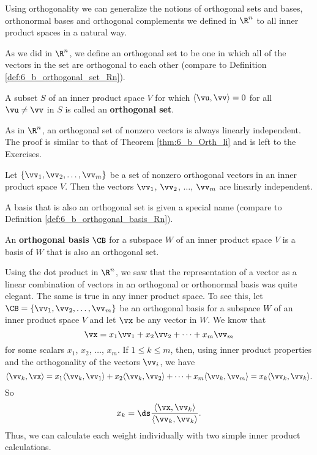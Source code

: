 Using orthogonality we can generalize the notions of orthogonal sets and bases, orthonormal bases and orthogonal complements we defined in $\R^n$ to all inner product spaces in a natural way.



As we did in $\R^n$, we define an orthogonal set to be one in which all of the vectors in the set are orthogonal to each other  (compare to Definition \ref{def:6_b_orthogonal_set_Rn}).

\begin{definition} A subset $S$ of an inner product space $V$ for which $\langle \vu, \vv \rangle = 0$ for all $\vu \neq \vv$ in $S$ is called an \textbf{orthogonal set}. 
\end{definition}

As in $\R^n$, an orthogonal set of nonzero vectors is always linearly independent. The proof is similar to that of Theorem  \ref{thm:6_b_Orth_li} and is left to the Exercises. 

\begin{theorem} \label{thm:6_c_Orth_li_ips} Let $\{\vv_1, \vv_2, \ldots, \vv_m\}$ be a set of nonzero orthogonal vectors in an inner product space $V$. Then the vectors $\vv_1$, $\vv_2$, $\ldots$, $\vv_m$ are linearly independent.
\end{theorem}


A basis that is also an orthogonal set is given a special name (compare to Definition \ref{def:6_b_orthogonal_basis_Rn}).

\begin{definition} An \textbf{orthogonal basis} $\CB$ for a subspace $W$ of an inner product space $V$ is a basis of $W$ that is also an orthogonal set.
\end{definition}

Using the dot product in $\R^n$, we saw that the representation of a vector as a linear combination of vectors in an orthogonal or orthonormal basis was quite elegant. The same is true in any inner product space. To see this, let $\CB = \{\vv_1, \vv_2, \ldots, \vv_m\}$ be an orthogonal basis for a subspace $W$ of an inner product space $V$ and let $\vx$ be any vector in $W$. We know that
\[\vx = x_1\vv_1 + x_2\vv_2 + \cdots + x_m \vv_m\]
for some scalars $x_1$, $x_2$, $\ldots$, $x_m$. If $1\leq k\leq m$, then, using inner product properties and the orthogonality of the vectors $\vv_i$, we have
\[\langle \vv_k, \vx \rangle = x_1 \langle \vv_k, \vv_1 \rangle + x_2 \langle \vv_k, \vv_2 \rangle + \cdots + x_m \langle \vv_k, \vv_m \rangle = x_k \langle \vv_k, \vv_k \rangle.\]
So
\[x_k = \ds \frac{\langle \vx, \vv_k \rangle}{\langle \vv_k,  \vv_k \rangle}.\]
Thus, we can calculate each weight individually with two simple inner product calculations. 

